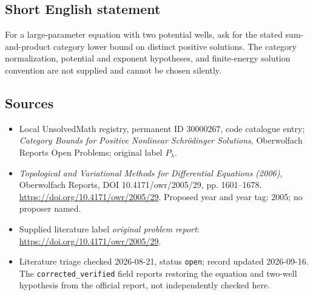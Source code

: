 \documentclass[11pt]{article}
\begin{document}
\subsection{Short English statement}
For a large-parameter equation with two potential wells, ask for the stated sum-and-product category lower bound on distinct positive solutions. The category normalization, potential and exponent hypotheses, and finite-energy solution convention are not supplied and cannot be chosen silently.
\subsection{Sources}
\begin{itemize}\item Local UnsolvedMath registry, permanent ID 30000267, code catalogue entry; \emph{Category Bounds for Positive Nonlinear Schr\"odinger Solutions}, Oberwolfach Reports Open Problems; original label \(P_\lambda\).\item \emph{Topological and Variational Methods for Differential Equations (2006)}, Oberwolfach Reports, DOI 10.4171/owr/2005/29, pp. 1601--1678. \url{https://doi.org/10.4171/owr/2005/29}. Proposed year and year tag: 2005; no proposer named.\item Supplied literature label \emph{original problem report}: \url{https://doi.org/10.4171/owr/2005/29}.\item Literature triage checked 2026-08-21, status \texttt{open}; record updated 2026-09-16. The \texttt{corrected\_verified} field reports restoring the equation and two-well hypothesis from the official report, not independently checked here.\end{itemize}
\end{document}
